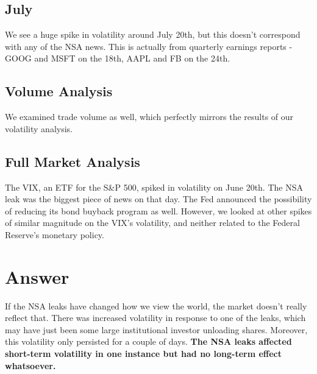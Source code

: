 \documentclass[11pt]{amsart}
\begin{document}
\subsection{July}
We see a huge spike in volatility around July 20th, but this doesn't correspond with any of the NSA news. This is actually from quarterly earnings reports - GOOG and MSFT on the 18th, AAPL and FB on the 24th.

\subsection{Volume Analysis}
We examined trade volume as well, which perfectly mirrors the results of our volatility analysis.

\subsection{Full Market Analysis}
The VIX, an ETF for the S\&P 500, spiked in volatility on June 20th. The NSA leak was the biggest piece of news on that day. The Fed announced the possibility of reducing its bond buyback program as well. However, we looked at other spikes of similar magnitude on the VIX's volatility, and neither related to the Federal Reserve's monetary policy.

\section{Answer}
If the NSA leaks have changed how we view the world, the market doesn't really reflect that. There was increased volatility in response to one of the leaks, which may have just been some large institutional investor unloading shares. Moreover, this volatility only persisted for a couple of days. \textbf{The NSA leaks affected short-term volatility in one instance but had no long-term effect whatsoever.}
\end{document}
